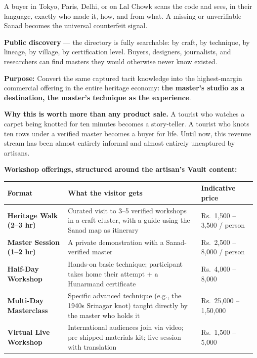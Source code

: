\documentclass[11pt, a4paper]{article}
\begin{document}
\begin{layerbox}
A buyer in Tokyo, Paris, Delhi, or on Lal Chowk scans the code and sees, in their language, exactly who made it, how, and from what. A missing or unverifiable Sanad becomes the universal counterfeit signal.

\textbf{Public discovery} --- the directory is fully searchable: by craft, by technique, by lineage, by village, by certification level. Buyers, designers, journalists, and researchers can find masters they would otherwise never know existed.
\end{layerbox}

\begin{layerbox}

\textbf{Purpose:} Convert the same captured tacit knowledge into the highest-margin commercial offering in the entire heritage economy: \textbf{the master's studio as a destination, the master's technique as the experience}.

\textbf{Why this is worth more than any product sale.} A tourist who watches a carpet being knotted for ten minutes becomes a story-teller. A tourist who knots ten rows under a verified master becomes a buyer for life. Until now, this revenue stream has been almost entirely informal and almost entirely uncaptured by artisans.

\textbf{Workshop offerings, structured around the artisan's Vault content:}

\begin{center}
\small
\begin{tabularx}{\linewidth}{>{\bfseries}lXX}
\toprule
Format & What the visitor gets & Indicative price \\
\midrule
Heritage Walk (2--3 hr) & Curated visit to 3--5 verified workshops in a craft cluster, with a guide using the Sanad map as itinerary & Rs.\ 1{,}500 -- 3{,}500 / person \\
Master Session (1--2 hr) & A private demonstration with a Sanad-verified master & Rs.\ 2{,}500 -- 8{,}000 / person \\
Half-Day Workshop & Hands-on basic technique; participant takes home their attempt + a Hunarmand certificate & Rs.\ 4{,}000 -- 8{,}000 \\
Multi-Day Masterclass & Specific advanced technique (e.g., the 1940s Srinagar knot) taught directly by the master who holds it & Rs.\ 25{,}000 -- 1{,}50{,}000 \\
Virtual Live Workshop & International audiences join via video; pre-shipped materials kit; live session with translation & Rs.\ 1{,}500 -- 5{,}000 \\
\bottomrule
\end{tabularx}
\end{center}


\end{layerbox}
\end{document}
